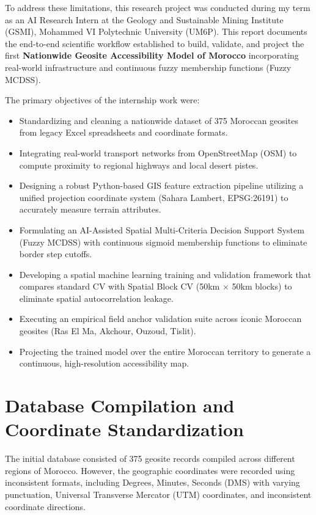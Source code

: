 \documentclass[11pt,twocolumn,a4paper]{article}
\begin{document}
To address these limitations, this research project was conducted during my term as an AI Research Intern at the Geology and Sustainable Mining Institute (GSMI), Mohammed VI Polytechnic University (UM6P). This report documents the end-to-end scientific workflow established to build, validate, and project the first \textbf{Nationwide Geosite Accessibility Model of Morocco} incorporating real-world infrastructure and continuous fuzzy membership functions (Fuzzy MCDSS).

The primary objectives of the internship work were:
\begin{itemize}
    \item Standardizing and cleaning a nationwide dataset of 375 Moroccan geosites from legacy Excel spreadsheets and coordinate formats.
    \item Integrating real-world transport networks from OpenStreetMap (OSM) to compute proximity to regional highways and local desert pistes.
    \item Designing a robust Python-based GIS feature extraction pipeline utilizing a unified projection coordinate system (Sahara Lambert, EPSG:26191) to accurately measure terrain attributes.
    \item Formulating an AI-Assisted Spatial Multi-Criteria Decision Support System (Fuzzy MCDSS) with continuous sigmoid membership functions to eliminate border step cutoffs.
    \item Developing a spatial machine learning training and validation framework that compares standard CV with Spatial Block CV (50km $\times$ 50km blocks) to eliminate spatial autocorrelation leakage.
    \item Executing an empirical field anchor validation suite across iconic Moroccan geosites (Ras El Ma, Akchour, Ouzoud, Tislit).
    \item Projecting the trained model over the entire Moroccan territory to generate a continuous, high-resolution accessibility map.
\end{itemize}

\section{Database Compilation and Coordinate Standardization}
The initial database consisted of 375 geosite records compiled across different regions of Morocco. However, the geographic coordinates were recorded using inconsistent formats, including Degrees, Minutes, Seconds (DMS) with varying punctuation, Universal Transverse Mercator (UTM) coordinates, and inconsistent coordinate directions.
\end{document}
